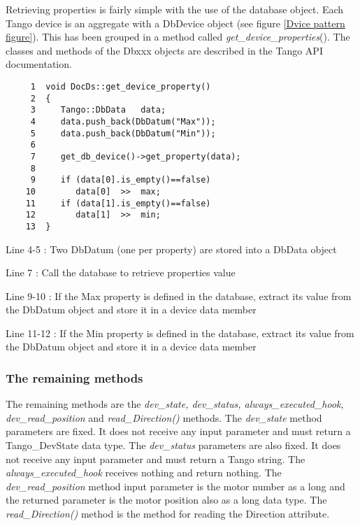 Retrieving properties is fairly simple with the
use of the database object. Each Tango device is an aggregate with
a DbDevice object (see figure \ref{Dvice pattern figure}). This has
been grouped in a method called \emph{get\_device\_properties}().
The classes and methods of the Dbxxx objects are described in the
Tango API documentation.


\begin{verbatim}
     1  void DocDs::get_device_property()
     2  {
     3     Tango::DbData   data;
     4     data.push_back(DbDatum("Max"));
     5     data.push_back(DbDatum("Min"));
     6  
     7     get_db_device()->get_property(data);
     8  
     9     if (data[0].is_empty()==false)
    10        data[0]  >>  max;
    11     if (data[1].is_empty()==false)
    12        data[1]  >>  min;
    13  }
\end{verbatim}


Line 4-5 : Two DbDatum (one per property) are stored into a DbData
object

Line 7 : Call the database to retrieve properties value

Line 9-10 : If the Max property is defined in the database, extract
its value from the DbDatum object and store it in a device data member

Line 11-12 : If the Min property is defined in the database, extract
its value from the DbDatum object and store it in a device data member


\subsubsection{The remaining methods}

The remaining methods are the \emph{dev\_state, dev\_status, always\_executed\_hook},
\emph{dev\_read\_position} and \emph{read\_Direction()} methods. The
\emph{dev\_state} method parameters are fixed. It
does not receive any input parameter and must return a Tango\_DevState
data type. The \emph{dev\_status} parameters are
also fixed. It does not receive any input parameter and must return
a Tango string. The \emph{always\_executed\_hook}
receives nothing and return nothing. The \emph{dev\_read\_position}
method input parameter is the motor number as a long and the returned
parameter is the motor position also as a long data type. The \emph{read\_Direction()}
method is the method for reading the Direction attribute.


